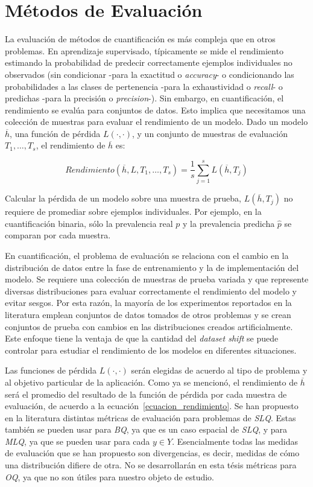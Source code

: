 \chapter{Métodos de Evaluación}\label{evaluacion}

La evaluación de métodos de cuantificación es más compleja que en otros
problemas. En aprendizaje supervisado, típicamente se mide el rendimiento
estimando la probabilidad de predecir correctamente ejemplos individuales no
observados (sin condicionar -para la exactitud o {\it accuracy\/}- o
condicionando las probabilidades a las clases de pertenencia -para la
exhaustividad o {\it recall\/}- o predichas -para la precisión o {\it
precision\/}-). Sin embargo, en cuantificación, el rendimiento se evalúa para
conjuntos de datos. Esto implica que necesitamos una colección de muestras para
evaluar el rendimiento de un modelo. Dado un modelo $\overline{h}$, una función
de pérdida $L(\cdot, \cdot)$, y un conjunto de muestras de evaluación ${T_1,
\dots, T_s}$, el rendimiento de $\overline{h}$ es:

\begin{equation}
    Rendimiento(\overline{h}, L, {T_1, \dots , T_s}) = \frac{1}{s}
    \sum_{j=1}^{s}L(\overline{h}, T_j)
    \label{ecuacion_rendimiento}
\end{equation}

Calcular la pérdida de un modelo sobre una muestra de prueba, $L(\overline{h},
T_j)$ no requiere de promediar sobre ejemplos individuales. Por ejemplo, en la
cuantificación binaria, sólo la prevalencia real $p$ y la prevalencia predicha
$\hat{p}$ se comparan por cada muestra.

En cuantificación, el problema de evaluación se relaciona con el cambio en la
distribución de datos entre la fase de entrenamiento y la de implementación del
modelo. Se requiere una colección de muestras de prueba variada y que represente
diversas distribuciones para evaluar correctamente el rendimiento del modelo y
evitar sesgos. Por esta razón, la mayoría de los experimentos reportados en la
literatura emplean conjuntos de datos tomados de otros problemas y se crean
conjuntos de prueba con cambios en las distribuciones creados artificialmente.
Este enfoque tiene la ventaja de que la cantidad del {\it dataset shift\/} se
puede controlar para estudiar el rendimiento de los modelos en diferentes
situaciones.

Las funciones de pérdida $L(\cdot, \cdot)$ serán elegidas de acuerdo al tipo de
problema y al objetivo particular de la aplicación. Como ya se mencionó, el
rendimiento de $\overline{h}$ será el promedio del resultado de la función de
pérdida por cada muestra de evaluación, de acuerdo a la
ecuación~\ref{ecuacion_rendimiento}. Se han propuesto en la literatura distintas
métricas de evaluación para problemas de {\it SLQ}. Estas también se pueden usar
para {\it BQ}, ya que es un caso espacial de {\it SLQ}, y para {\it MLQ}, ya que
se pueden usar para cada $y \in Y$. Esencialmente todas las medidas de
evaluación que se han propuesto son divergencias, es decir, medidas de cómo una
distribución difiere de otra. No se desarrollarán en esta tésis métricas para
{\it OQ}, ya que no son útiles para nuestro objeto de estudio.

